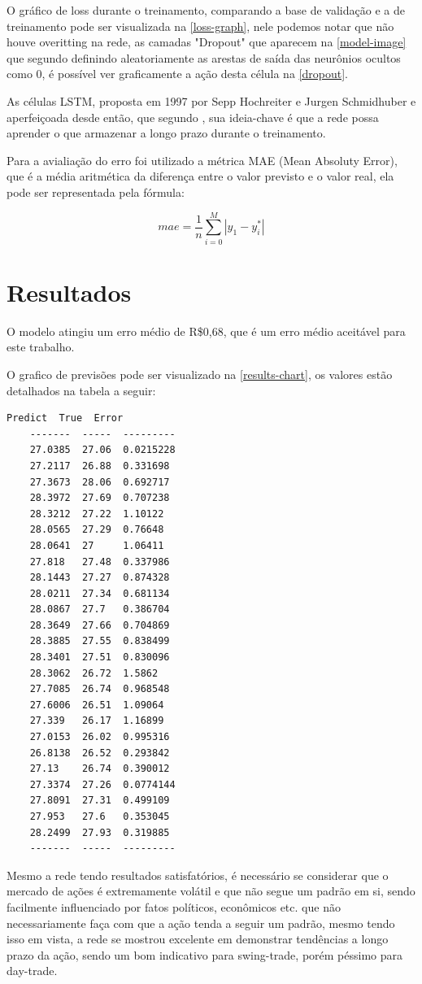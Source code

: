\documentclass[
	article,			%
	11pt,				%
	oneside,			%
	a4paper,			%
	english,			%
	brazil,				%
	sumario=tradicional
	]{abntex2}
\begin{document}
O gráfico de loss durante o treinamento, comparando a base de validação e a de treinamento pode ser visualizada na \autoref{loss-graph}, nele podemos notar que não houve overitting na rede, as camadas "Dropout" que aparecem na \autoref{model-image} que segundo  definindo aleatoriamente as arestas de saída das neurônios ocultos como 0, é possível ver graficamente a ação desta célula na \autoref{dropout}.

As células LSTM, proposta em 1997 por Sepp Hochreiter e Jurgen Schmidhuber e aperfeiçoada desde então, que segundo , sua ideia-chave é que a rede possa aprender o que armazenar a longo prazo durante o treinamento.

Para a avialiação do erro foi utilizado a métrica MAE (Mean Absoluty Error), que é a média aritmética da diferença entre o valor previsto e o valor real, ela pode ser representada pela fórmula:

\begin{equation}
mae = \frac{1}{n}\sum_{i=0}^M |{y_1 - y^*_i}|
\end{equation}

\section{Resultados}

O modelo atingiu um erro médio de R\$0,68, que é um erro médio aceitável para este trabalho.

O grafico de previsões pode ser visualizado na \autoref{results-chart}, os valores estão detalhados na tabela a seguir:

\begin{verbatim}
Predict  True  Error
	-------  -----  ---------
	27.0385  27.06  0.0215228
	27.2117  26.88  0.331698
	27.3673  28.06  0.692717
	28.3972  27.69  0.707238
	28.3212  27.22  1.10122
	28.0565  27.29  0.76648
	28.0641  27     1.06411
	27.818   27.48  0.337986
	28.1443  27.27  0.874328
	28.0211  27.34  0.681134
	28.0867  27.7   0.386704
	28.3649  27.66  0.704869
	28.3885  27.55  0.838499
	28.3401  27.51  0.830096
	28.3062  26.72  1.5862
	27.7085  26.74  0.968548
	27.6006  26.51  1.09064
	27.339   26.17  1.16899
	27.0153  26.02  0.995316
	26.8138  26.52  0.293842
	27.13    26.74  0.390012
	27.3374  27.26  0.0774144
	27.8091  27.31  0.499109
	27.953   27.6   0.353045
	28.2499  27.93  0.319885
	-------  -----  ---------
\end{verbatim}

Mesmo a rede tendo resultados satisfatórios, é necessário se considerar que o mercado de ações é extremamente volátil e que não segue um padrão em si, sendo facilmente influenciado por fatos políticos, econômicos etc. que não necessariamente faça com que a ação tenda a seguir um padrão, mesmo tendo isso em vista, a rede se mostrou excelente em demonstrar tendências a longo prazo da ação, sendo um bom indicativo para swing-trade, porém péssimo para day-trade.
\end{document}
